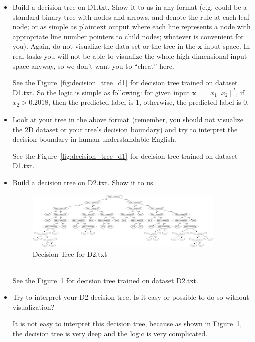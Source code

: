 \documentclass[a4paper]{article}
\theoremstyle{definition}
\def\x{\mathbf x}
\newenvironment{soln}{
    \leavevmode\color{blue}\ignorespaces
}{}
\begin{document}
\begin{enumerate}
\begin{itemize}
  \item Build a decision tree on D1.txt.  Show it to us in any format (e.g. could be a standard binary tree with nodes and arrows, and denote the rule at each leaf node; or as simple as plaintext output where each line represents a node with appropriate line number pointers to child nodes; whatever is convenient for you). Again, do not visualize the data set or the tree in the $\x$ input space.  In real tasks you will not be able to visualize the whole high dimensional input space anyway, so we don't want you to ``cheat'' here. 
  \begin{soln}
    See the Figure~\ref{fig:decision_tree_d1} for decision tree trained on dataset D1.txt. So the logic is simple as following: for given input $\x =[x_1 \;\; x_2]^T$, if $x_2 > 0.2018$, then the predicted label is 1, otherwise, the predicted label is 0.
  \end{soln}
  \item Look at your tree in the above format (remember, you should not visualize the 2D dataset or your tree's decision boundary) and try to interpret the decision boundary in human understandable English. 
  \begin{soln}
    See the Figure~\ref{fig:decision_tree_d1} for decision tree trained on dataset D1.txt.
  \end{soln}
  \item Build a decision tree on D2.txt.  Show it to us. 
  \begin{soln}
    \begin{figure}
      \centering
      \includegraphics[width=0.9\textwidth]{./data/custom_decision_tree_D2.png}
      \caption{Decision Tree for D2.txt}
      \label{fig:decision_tree_d2}
    \end{figure}
    \\See the Figure~\ref{fig:decision_tree_d2} for decision tree trained on dataset D2.txt.
  \end{soln}
  \item Try to interpret your D2 decision tree. Is it easy or possible to do so without visualization? \\
  \begin{soln}
    It is not easy to interpret this decision tree, because as shown in Figure~\ref{fig:decision_tree_d2}, the decision tree is very deep and the logic is very complicated.
  \end{soln}
  \end{itemize}


\end{enumerate}
\end{document}
